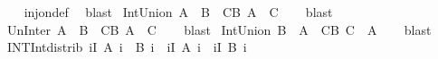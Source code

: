 \begin{isabellebody}
%
\isadelimproof
\ \ %
\endisadelimproof
%
\isatagproof
{}\isamarkupfalse%
\ inj{\isacharunderscore}{\kern0pt}on{\isacharunderscore}{\kern0pt}def\ \isamarkupfalse%
\ blast%
\endisatagproof
{\isafoldproof}%
%
\isadelimproof
%
\endisadelimproof
%
\isadelimdocument
%
\endisadelimdocument
%
\isatagdocument
%
\isamarkuptrue%
%
\endisatagdocument
{\isafolddocument}%
%
\isadelimdocument
%
\endisadelimdocument
{}\isamarkupfalse%
\ Int{\isacharunderscore}{\kern0pt}Union{\isacharcolon}{\kern0pt}\ {\isachardoublequoteopen}A\ {\isasyminter}\ {\isasymUnion}B\ {\isacharequal}{\kern0pt}\ {\isacharparenleft}{\kern0pt}{\isasymUnion}C{\isasymin}B{\isachardot}{\kern0pt}\ A\ {\isasyminter}\ C{\isacharparenright}{\kern0pt}{\isachardoublequoteclose}\isanewline
%
\isadelimproof
\ \ %
\endisadelimproof
%
\isatagproof
{}\isamarkupfalse%
\ blast%
\endisatagproof
{\isafoldproof}%
%
\isadelimproof
\isanewline
%
\endisadelimproof
\isanewline
{}\isamarkupfalse%
\ Un{\isacharunderscore}{\kern0pt}Inter{\isacharcolon}{\kern0pt}\ {\isachardoublequoteopen}A\ {\isasymunion}\ {\isasymInter}B\ {\isacharequal}{\kern0pt}\ {\isacharparenleft}{\kern0pt}{\isasymInter}C{\isasymin}B{\isachardot}{\kern0pt}\ A\ {\isasymunion}\ C{\isacharparenright}{\kern0pt}{\isachardoublequoteclose}\isanewline
%
\isadelimproof
\ \ %
\endisadelimproof
%
\isatagproof
{}\isamarkupfalse%
\ blast%
\endisatagproof
{\isafoldproof}%
%
\isadelimproof
\isanewline
%
\endisadelimproof
\isanewline
{}\isamarkupfalse%
\ Int{\isacharunderscore}{\kern0pt}Union{}{\isacharcolon}{\kern0pt}\ {\isachardoublequoteopen}{\isasymUnion}B\ {\isasyminter}\ A\ {\isacharequal}{\kern0pt}\ {\isacharparenleft}{\kern0pt}{\isasymUnion}C{\isasymin}B{\isachardot}{\kern0pt}\ C\ {\isasyminter}\ A{\isacharparenright}{\kern0pt}{\isachardoublequoteclose}\isanewline
%
\isadelimproof
\ \ %
\endisadelimproof
%
\isatagproof
{}\isamarkupfalse%
\ blast%
\endisatagproof
{\isafoldproof}%
%
\isadelimproof
\isanewline
%
\endisadelimproof
\isanewline
{}\isamarkupfalse%
\ INT{\isacharunderscore}{\kern0pt}Int{\isacharunderscore}{\kern0pt}distrib{\isacharcolon}{\kern0pt}\ {\isachardoublequoteopen}{\isacharparenleft}{\kern0pt}{\isasymInter}i{\isasymin}I{\isachardot}{\kern0pt}\ A\ i\ {\isasyminter}\ B\ i{\isacharparenright}{\kern0pt}\ {\isacharequal}{\kern0pt}\ {\isacharparenleft}{\kern0pt}{\isasymInter}i{\isasymin}I{\isachardot}{\kern0pt}\ A\ i{\isacharparenright}{\kern0pt}\ {\isasyminter}\ {\isacharparenleft}{\kern0pt}{\isasymInter}i{\isasymin}I{\isachardot}{\kern0pt}\ B\ i{\isacharparenright}{\kern0pt}{\isachardoublequoteclose}\isanewline

\end{isabellebody}
